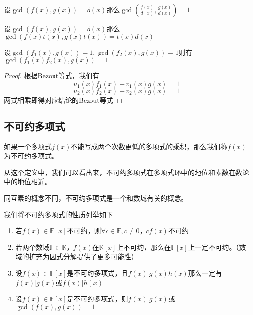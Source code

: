 \documentclass{ctexart}
\begin{document}
\begin{proposition}
    设$\gcd(f(x),g(x)) = d(x)$那么$\gcd(\frac{f(x)}{d(x)} , \frac{g(x)}{d(x)}) = 1$
\end{proposition}

\begin{proposition}
    设$\gcd(f(x),g(x)) = d(x)$那么$\gcd(f(x)t(x), g(x)t(x)) = t(x)d(x)$
\end{proposition}

\begin{proposition}
    设$\gcd(f_1(x),g(x)) = 1, \gcd(f_2(x),g(x)) = 1$则有$\gcd(f_1(x)f_2(x),g(x)) = 1$
\end{proposition}
\begin{proof}
    根据Bezout等式，我们有
    $$u_1(x)f_1(x) + v_1(x)g(x) = 1$$
    $$u_2(x)f_2(x) + v_2(x)g(x) = 1$$
    两式相乘即得对应结论的Bezout等式
    \qedhere
\end{proof}

\subsection{不可约多项式}

\begin{definition}
    如果一个多项式$f(x)$不能写成两个次数更低的多项式的乘积，那么我们称$f(x)$为不可约多项式。
\end{definition}

从这个定义中，我们可以看出来，不可约多项式在多项式环中的地位和素数在数论中的地位相近。

同互素的概念不同，不可约多项式是一个和数域有关的概念。

\begin{proposition}
    我们将不可约多项式的性质列举如下
    \begin{enumerate}
        \item 若$f(x) \in \mathbb{F}[x]$不可约，则$\forall c \in \mathbb F,c \neq 0$，$cf(x)$不可约 
        \item 若两个数域$\mathbb{F \in K}$，$f(x)$在$\mathbb{K}[x]$上不可约，那么在$\mathbb {F}[x]$上一定不可约。（数域的扩充为因式分解提供了更多可能性）
        \item 设$f(x) \in \mathbb F[x]$是不可约多项式，且$f(x) | g(x)h(x)$那么一定有$f(x)|g(x)$或$f(x)|h(x)$
        \item 设$f(x) \in \mathbb F[x]$是不可约多项式，则$f(x)|g(x)$或$\gcd(f(x),g(x)) = 1$
    \end{enumerate}
\end{proposition}
\end{document}
